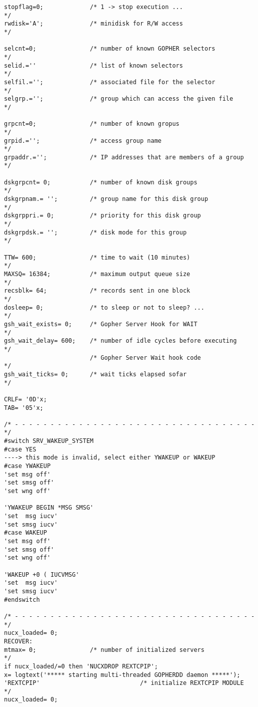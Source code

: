 \begin{verbatim}
stopflag=0;             /* 1 -> stop execution ...                     */
rwdisk='A';             /* minidisk for R/W access                     */

selcnt=0;               /* number of known GOPHER selectors            */
selid.=''               /* list of known selectors                     */
selfil.='';             /* associated file for the selector            */
selgrp.='';             /* group which can access the given file       */

grpcnt=0;               /* number of known gropus                      */
grpid.='';              /* access group name                           */
grpaddr.='';            /* IP addresses that are members of a group    */

dskgrpcnt= 0;           /* number of known disk groups                 */
dskgrpnam.= '';         /* group name for this disk group              */
dskgrppri.= 0;          /* priority for this disk group                */
dskgrpdsk.= '';         /* disk mode for this group                    */

TTW= 600;               /* time to wait (10 minutes)                   */
MAXSQ= 16384;           /* maximum output queue size                   */
recsblk= 64;            /* records sent in one block                   */
dosleep= 0;             /* to sleep or not to sleep? ...               */
gsh_wait_exists= 0;     /* Gopher Server Hook for WAIT                 */
gsh_wait_delay= 600;    /* number of idle cycles before executing      */ 
                        /* Gopher Server Wait hook code                */
gsh_wait_ticks= 0;      /* wait ticks elapsed sofar                    */

CRLF= '0D'x;
TAB= '05'x;

/* - - - - - - - - - - - - - - - - - - - - - - - - - - - - - - - - - - */
#switch SRV_WAKEUP_SYSTEM
#case YES
----> this mode is invalid, select either YWAKEUP or WAKEUP
#case YWAKEUP
'set msg off'
'set smsg off'
'set wng off'

'YWAKEUP BEGIN *MSG SMSG'
'set  msg iucv'
'set smsg iucv'
#case WAKEUP
'set msg off'
'set smsg off'
'set wng off'

'WAKEUP +0 ( IUCVMSG'
'set  msg iucv'
'set smsg iucv'
#endswitch

/* - - - - - - - - - - - - - - - - - - - - - - - - - - - - - - - - - - */
nucx_loaded= 0;
RECOVER:
mtmax= 0;               /* number of initialized servers               */
if nucx_loaded/=0 then 'NUCXDROP REXTCPIP';
x= logtext('***** starting multi-threaded GOPHERDD daemon *****');
'REXTCPIP'                            /* initialize REXTCPIP MODULE    */
nucx_loaded= 0;


\end{verbatim}
